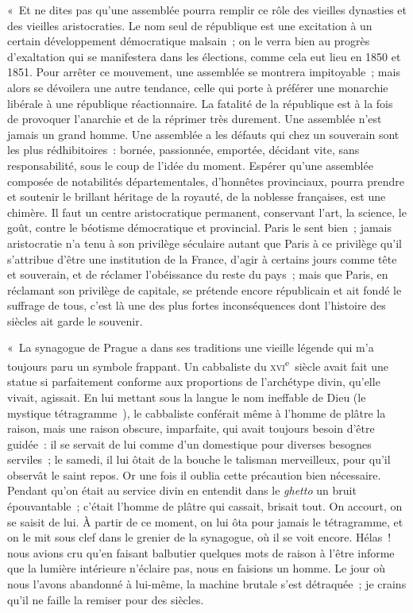 \documentclass[french,twoside]{book} %
\newenvironment{quoteblock}%
  {\begin{quoting}}
  {\end{quoting}}
\newenvironment{quotebar}{%
    \def\FrameCommand{{\color{rubric!10!}\vrule width 0.5em} \hspace{0.9em}}%
    \def\OuterFrameSep{\itemsep} %
    \MakeFramed {\advance\hsize-\width \FrameRestore}
  }%
  {%
    \endMakeFramed
  }
\renewenvironment{quoteblock}%
  {%
    \savenotes
    \setstretch{0.9}
    \normalfont
    \begin{quotebar}
  }
  {%
    \end{quotebar}
    \spewnotes
  }
\begin{document}
\begin{quoteblock}
 « Et ne dites pas qu’une assemblée pourra remplir ce rôle des vieilles dynasties et des vieilles aristocraties. Le nom seul de république est une excitation à un certain développement démocratique malsain ; on le verra bien au progrès d’exaltation qui se manifestera dans les élections, comme cela eut lieu en 1850 et 1851. Pour arrêter ce mouvement, une assemblée se montrera impitoyable ; mais alors se dévoilera une autre tendance, celle qui porte à préférer une monarchie libérale à une république réactionnaire. La fatalité de la république est à la fois de provoquer l’anarchie et de la réprimer très durement. Une assemblée n’est jamais un grand homme. Une assemblée a les défauts qui chez un souverain sont les plus rédhibitoires : bornée, passionnée, emportée, décidant vite, sans responsabilité, sous le coup de l’idée du moment. Espérer qu’une assemblée composée de notabilités départementales, d’honnêtes provinciaux, pourra prendre et soutenir le brillant héritage de la royauté, de la noblesse françaises, est une chimère. Il faut un centre aristocratique permanent, conservant l’art, la science, le goût, contre le béotisme démocratique et provincial. Paris le sent bien ; jamais aristocratie n’a tenu à son privilège séculaire autant que Paris à ce privilège qu’il s’attribue d’être une institution de la France, d’agir à certains jours comme tête et souverain, et de réclamer l’obéissance du reste du pays ; mais que Paris, en réclamant son privilège de capitale, se prétende encore républicain et ait fondé le suffrage de tous, c’est là une des plus fortes inconséquences dont l’histoire des siècles ait garde le souvenir.\par
 « La synagogue de Prague a dans ses traditions une vieille légende qui m’a toujours paru un symbole frappant. Un cabbaliste du \textsc{xvi}\textsuperscript{e} siècle avait fait une statue si parfaitement conforme aux proportions de l’archétype divin, qu’elle vivait, agissait. En lui mettant sous la langue le nom ineffable de Dieu (le mystique tétragramme ), le cabbaliste conférait même à l’homme de plâtre la raison, mais une raison obscure, imparfaite, qui avait toujours besoin d’être guidée : il se servait de lui comme d’un domestique pour diverses besognes serviles ; le samedi, il lui ôtait de la bouche le talisman merveilleux, pour qu’il observât le saint repos. Or une fois il oublia cette précaution bien nécessaire. Pendant qu’on était au service divin en entendit dans le {\itshape ghetto} un bruit épouvantable ; c’était l’homme de plâtre qui cassait, brisait tout. On accourt, on se saisit de lui. À partir de ce moment, on lui ôta pour jamais le tétragramme, et on le mit sous clef dans le grenier de la synagogue, où il se voit encore. Hélas ! nous avions cru qu’en faisant balbutier quelques mots de raison à l’être informe que la lumière intérieure n’éclaire pas, nous en faisions un homme. Le jour où nous l’avons abandonné à lui-même, la machine brutale s’est détraquée ; je crains qu’il ne faille la remiser pour des siècles.\par

\end{quoteblock}
\end{document}
